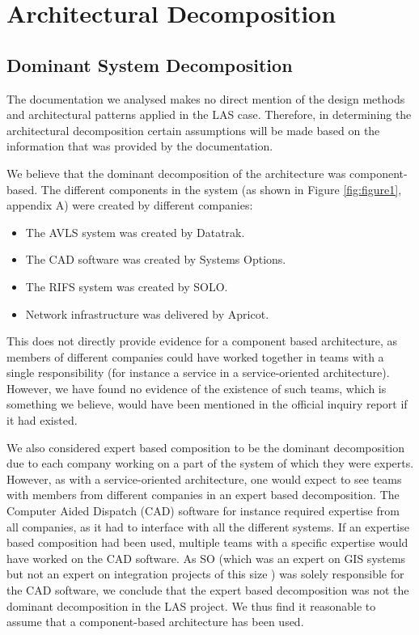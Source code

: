 \section*{Architectural Decomposition}

\subsection*{Dominant System Decomposition}

The documentation we analysed makes no direct mention of the design methods and architectural patterns applied in the LAS case.
Therefore, in determining the architectural decomposition certain assumptions will be made based on the information that was provided by the documentation.

We believe that the dominant decomposition of the architecture was component-based.
The different components in the system (as shown in Figure \ref{fig:figure1}, appendix A) were created by different companies:
\begin{itemize}[noitemsep]
\item The AVLS system was created by Datatrak.
\item The CAD software was created by Systems Options.
\item The RIFS system was created by SOLO.
\item Network infrastructure was delivered by Apricot.
\end{itemize}

This does not directly provide evidence for a component based architecture, as members of different companies could have worked together in teams with a single responsibility
(for instance a service in a service-oriented architecture).
However, we have found no evidence of the existence of such teams, which is something we believe, would have been mentioned in the official inquiry report \autocite{officialreport} if it had existed.

We also considered expert based composition to be the dominant decomposition due to each company working on a part of the system of which they were experts.
However, as with a service-oriented architecture, one would expect to see teams with members from different companies in an expert based decomposition.
The Computer Aided Dispatch (CAD) software for instance required expertise from all companies, as it had to interface with all the different systems.
If an expertise based composition had been used, multiple teams with a specific expertise would have worked on the CAD software.
As SO (which was an expert on GIS systems \autocite{techsum} but not an expert on integration projects of this size \autocite[3078]{officialreport}) was solely responsible for the CAD software,
we conclude that the expert based decomposition was not the dominant decomposition in the LAS project.
We thus find it reasonable to assume that a component-based architecture has been used.

